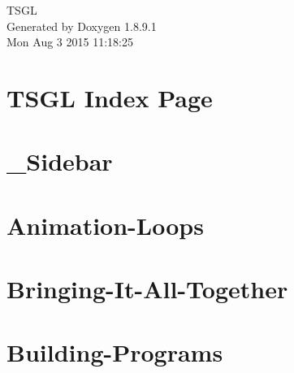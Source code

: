 \documentclass[twoside]{book}
\newcommand{\+}{\discretionary{\mbox{\scriptsize$\hookleftarrow$}}{}{}}
\newcommand{\clearemptydoublepage}{%
  \newpage{\pagestyle{empty}\cleardoublepage}%
}
\begin{document}
\hypersetup{pageanchor=false,
             bookmarks=true,
             bookmarksnumbered=true,
             pdfencoding=unicode
            }
\begin{titlepage}
\vspace*{7cm}
\begin{center}%
{\Large T\+S\+G\+L }\\
\vspace*{1cm}
{\large Generated by Doxygen 1.8.9.1}\\
\vspace*{0.5cm}
{\small Mon Aug 3 2015 11:18:25}\\
\end{center}
\end{titlepage}
\clearemptydoublepage
\tableofcontents
\clearemptydoublepage
{}
\hypersetup{pageanchor=true}

\chapter{T\+S\+G\+L Index Page}
\label{index}\hypertarget{index}{}
\chapter{\+\_\+\+Sidebar}
\label{md__home_pretzel_workspace_tsgl__t_s_g_l_docs-wiki___sidebar}
\hypertarget{md__home_pretzel_workspace_tsgl__t_s_g_l_docs-wiki___sidebar}{}

\chapter{Animation-\/\+Loops}
\label{md__home_pretzel_workspace_tsgl__t_s_g_l_docs-wiki__animation-_loops}
\hypertarget{md__home_pretzel_workspace_tsgl__t_s_g_l_docs-wiki__animation-_loops}{}

\chapter{Bringing-\/\+It-\/\+All-\/\+Together}
\label{md__home_pretzel_workspace_tsgl__t_s_g_l_docs-wiki__bringing-_it-_all-_together}
\hypertarget{md__home_pretzel_workspace_tsgl__t_s_g_l_docs-wiki__bringing-_it-_all-_together}{}

\chapter{Building-\/\+Programs}
\label{md__home_pretzel_workspace_tsgl__t_s_g_l_docs-wiki__building-_programs}
\hypertarget{md__home_pretzel_workspace_tsgl__t_s_g_l_docs-wiki__building-_programs}{}

\end{document}
